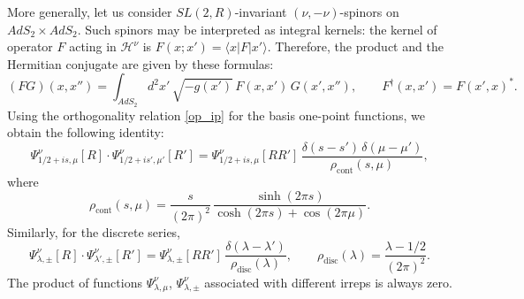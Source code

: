 \documentclass[11pt]{article}
\newcommand*{\bra}[1]{\langle{#1}|}
\newcommand*{\ket}[1]{|{#1}\rangle}
\newcommand{\calH}{\mathcal{H}}
\newcommand{\RR}{\mathbb{R}}
\DeclareMathOperator{\SL}{SL}
\DeclareMathOperator{\AdS}{AdS}
\newcommand{\rcont}{\rho_{\text{cont}}}
\newcommand{\rdisc}{\rho_{\text{disc}}}
\def\widetilde#1{#1}%
\def\AdS{AdS}
\def\SL{SL}
\def\RR{R}
\begin{document}
More generally, let us consider $\widetilde{\SL}(2,\RR)$-invariant $(\nu,-\nu)$-spinors on $\widetilde{\AdS}_2\times\widetilde{\AdS}_2$. Such spinors may be interpreted as integral kernels: the kernel of operator $F$ acting in $\calH^{\nu}$ is $F(x;x')=\bra{x}F\ket{x'}$. Therefore, the product and the Hermitian conjugate are given by these formulas:
\begin{equation}
(FG)(x,x'')
=\int_{\widetilde{\AdS}_2}d^{2}x'\,\sqrt{-g(x')}\,F(x,x')\,G(x',x''),\qquad
F^{\dag}(x,x')=F(x',x)^{*}.
\end{equation}
Using the orthogonality relation \eqref{op_ip} for the basis one-point functions, we obtain the following identity:
\begin{equation} \label{cwfnorm}
\Psi^{\nu}_{1/2+is,\mu}[R]
\cdot \Psi^{\nu}_{1/2+is',\mu'}[R']
=\Psi^{\nu}_{1/2+is,\mu}[RR']\,
\frac{\delta(s-s')\,\delta(\mu-\mu')}{\rcont(s,\mu)},
\end{equation}
where
\begin{equation} \label{rhoc}
\rcont(s,\mu)=\frac{s}{(2\pi)^{2}}\,
\frac{\sinh(2\pi s)}{\cosh(2\pi s)+\cos(2\pi\mu)}.
\end{equation}
Similarly, for the discrete series,
\begin{equation} \label{dwfnorm}
\Psi^{\nu}_{\lambda,\pm}[R]
\cdot\Psi^{\nu}_{\lambda',\pm}[R']
=\Psi^{\nu}_{\lambda,\pm}[RR']\,
\frac{\delta(\lambda-\lambda')}{\rdisc(\lambda)},\qquad
\rdisc(\lambda)=\frac{\lambda-1/2}{(2\pi)^{2}}.
\end{equation}
The product of functions $\Psi^{\nu}_{\lambda,\mu}$, $\Psi^{\nu}_{\lambda,\pm}$ associated with different irreps is always zero.
\end{document}
